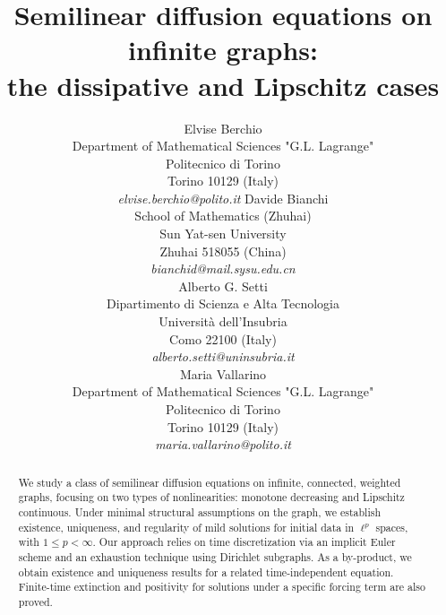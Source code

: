 \documentclass[journal]{article}
\theoremstyle{nonitalic}
\theoremstyle{nonitalic}
\theoremstyle{plain} %
\numberwithin{equation}{section}
\begin{document}
\title{Semilinear diffusion equations on infinite graphs:\\ the dissipative and Lipschitz cases}
\date{}
\author{Elvise Berchio\\
Department of Mathematical Sciences "G.L. Lagrange"\\ Politecnico di Torino\\
Torino 10129 (Italy)\\
\textit{elvise.berchio@polito.it}
\And 
Davide Bianchi\\
	School of Mathematics (Zhuhai)\\
	Sun Yat-sen University\\
	Zhuhai 518055 (China)\\
    \textit{bianchid@mail.sysu.edu.cn}\\
\And
Alberto G. Setti\\
Dipartimento di Scienza e Alta Tecnologia\\
	Universit\`a dell'Insubria\\
	Como 22100 (Italy)\\
\textit{alberto.setti@uninsubria.it}\\
\And
Maria Vallarino\\
Department of Mathematical Sciences "G.L. Lagrange"\\ Politecnico di Torino\\
Torino 10129 (Italy)\\
\textit{maria.vallarino@polito.it}
}

\setcounter{tocdepth}{2}




\maketitle

\begin{abstract}
We study a class of semilinear diffusion equations on infinite, connected, weighted graphs, focusing on two types of nonlinearities: monotone decreasing and Lipschitz continuous. Under minimal structural assumptions on the graph, we establish existence, uniqueness, and regularity of mild solutions for initial data in $\ell^p$ spaces, with $1\leq p<\infty$. Our approach relies on time discretization via an implicit Euler scheme and an exhaustion technique using Dirichlet subgraphs. As a by-product, we obtain existence and uniqueness results for a related time-independent equation. Finite-time extinction and positivity for solutions under a specific forcing term are also proved. 

\end{abstract}
\end{document}
